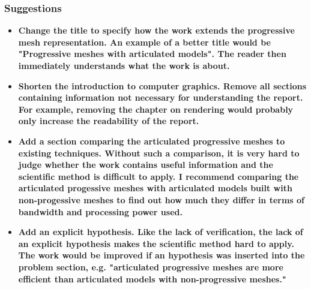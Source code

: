 \documentclass{article}
\begin{document}
\subsubsection{Suggestions}
\begin{itemize}
  \item \textbf{Change the title to specify how the work extends the progressive mesh
      representation. An example of a better title would be "Progressive
      meshes with articulated models". The reader then immediately understands
    what the work is about.}
  \item \textbf{Shorten the introduction to computer graphics. Remove all sections
      containing information not necessary for understanding the report. For
      example, removing the chapter on rendering would probably only increase the
    readability of the report.}
  \item \textbf{Add a section comparing the articulated progressive meshes to existing
      techniques. Without such a comparison, it is very hard to judge whether
      the work contains useful information and the scientific method is difficult
      to apply. I recommend comparing the articulated progessive meshes with
      articulated models built with non-progessive meshes to find out how much
    they differ in terms of bandwidth and processing power used.}
  \item \textbf{Add an explicit hypothesis. Like the lack of verification,
    the lack of an explicit hypothesis makes the scientific method hard to
  apply. The work would be improved if an hypothesis was inserted into the
problem section, e.g. "articulated progressive meshes are more efficient than
articulated models with non-progressive meshes."}
\end{itemize}


\end{document}
